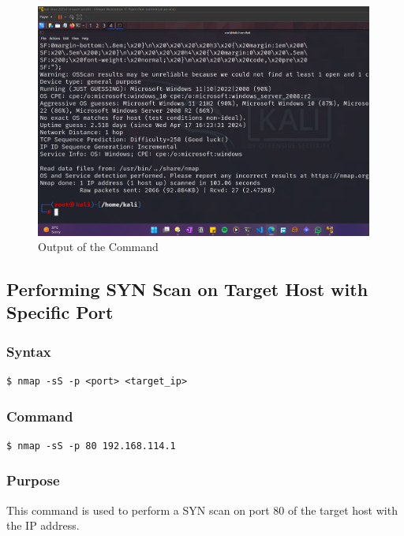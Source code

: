 \documentclass[11pt]{article}
\begin{document}
\begin{figure}[H]
    \centering
    \includegraphics[width=0.99\textwidth]{a3_ss (4).png}
    \caption{Output of the Command}
\end{figure}

\subsection{Performing SYN Scan on Target Host with Specific Port}

\subsubsection*{Syntax}
\begin{verbatim}
$ nmap -sS -p <port> <target_ip>
\end{verbatim}

\subsubsection*{Command}
\begin{verbatim}
$ nmap -sS -p 80 192.168.114.1
\end{verbatim}

\subsubsection*{Purpose}
This command is used to perform a SYN scan on port 80 of the target host with the IP address.
\end{document}
